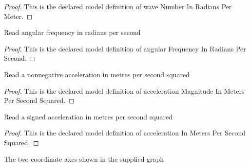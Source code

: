 \begin{proof}
  This is the declared model definition of wave Number In Radians Per Meter.
\end{proof}
\begin{definition}
  \label{def:physics:phyx-mini-0302:phyxminiproblems-problemphyxmini0302-angularfrequencyinradianspersecond}
  Read angular frequency in radians per second
\end{definition}
\begin{proof}
  This is the declared model definition of angular Frequency In Radians Per Second.
\end{proof}
\begin{definition}
  \label{def:physics:phyx-mini-0302:phyxminiproblems-problemphyxmini0302-accelerationmagnitudeinmeterspersecondsquared}
  Read a nonnegative acceleration in metres per second squared
\end{definition}
\begin{proof}
  This is the declared model definition of acceleration Magnitude In Meters Per Second Squared.
\end{proof}
\begin{definition}
  \label{def:physics:phyx-mini-0302:phyxminiproblems-problemphyxmini0302-accelerationinmeterspersecondsquared}
  Read a signed acceleration in metres per second squared
\end{definition}
\begin{proof}
  This is the declared model definition of acceleration In Meters Per Second Squared.
\end{proof}
\begin{definition}
  \label{def:physics:phyx-mini-0302:phyxminiproblems-problemphyxmini0302-graphaxis}
  The two coordinate axes shown in the supplied graph
\end{definition}
